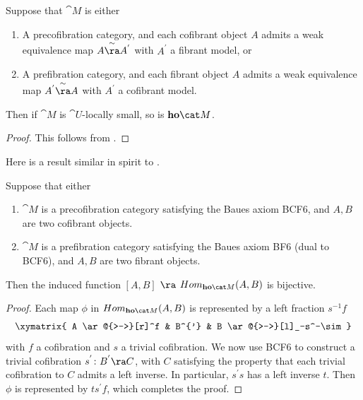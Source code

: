 \begin{prop}
\label{prop:smallhomotopycat2}
Suppose that ${\cat M}$ is either
\begin{enumerate}
\item
A precofibration category, and each cofibrant object $A$ admits a weak equivalence map $A \overset{\sim}{\ra} A^{'}$ with $A^{'}$ a fibrant model, or
\item
A prefibration category, and each fibrant object $A$ admits a weak equivalence map $A^{'} \overset{\sim}{\ra} A$ with $A^{'}$ a cofibrant model.
\end{enumerate}

Then if ${\cat M}$ is ${\cat U}$-locally small, so is ${\bf ho}{\cat M}$.
\end{prop}

\begin{proof}
This follows from .
\end{proof}

Here is a result similar in spirit to .
\begin{prop}
\label{prop:smallhomotopycatbaues}
Suppose that either
\begin{enumerate}
\item
\label{prop:smallhomotopycat:baues1}
${\cat M}$ is a precofibration category satisfying the Baues axiom BCF6, and $A, B$ are two cofibrant objects.
\item
${\cat M}$ is a prefibration category satisfying the Baues axiom BF6 (dual to BCF6), and $A, B$ are two fibrant objects.
\end{enumerate}

Then the induced function $[A, B]$ $\ra$ $Hom_{{\bf ho}{\cat M}}(A, B)$ is bijective.
\end{prop}

\begin{proof}
Each map $\phi$ in $Hom_{{\bf ho}{\cat M}}(A, B)$ is represented by a left fraction $s^{-1}f$
\[
\xymatrix{ A \ar@{>->}[r]^f & B^{'} & B \ar@{>->}[l]_-s^-\sim
  }
\]
with $f$ a cofibration and $s$ a trivial cofibration. We now use BCF6 to construct a trivial cofibration $s^{'} \colon B^{'} \ra C$, with $C$ satisfying the property that each trivial cofibration to $C$ admits a left inverse. In particular, $s^{'}s$ has a left inverse $t$. Then $\phi$ is represented by $ts^{'}f$, which completes the proof.
\end{proof}

